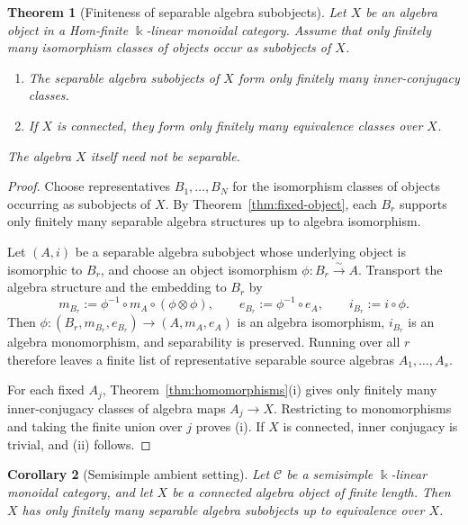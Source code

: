 \documentclass[11pt]{amsart}
\newtheorem{theorem}{Theorem}[section]
\newtheorem{corollary}[theorem]{Corollary}
\theoremstyle{definition}
\theoremstyle{remark}
\newcommand{\C}{\mathcal C}
\newcommand{\kk}{\Bbbk}
\begin{document}
\begin{theorem}[Finiteness of separable algebra subobjects]
\label{thm:subobjects}
Let $X$ be an algebra object in a Hom-finite $\kk$-linear monoidal category.
Assume that only finitely many isomorphism classes of objects occur as
subobjects of $X$.
\begin{enumerate}[label=\textup{(\roman*)}]
  \item The separable algebra subobjects of $X$ form only finitely many
  inner-conjugacy classes.
  \item If $X$ is connected, they form only finitely many equivalence
  classes over $X$.
\end{enumerate}
The algebra $X$ itself need not be separable.
\end{theorem}

\begin{proof}
Choose representatives $B_1,\ldots,B_N$ for the isomorphism classes of
objects occurring as subobjects of $X$.  By
Theorem~\ref{thm:fixed-object}, each $B_r$ supports only finitely many
separable algebra structures up to algebra isomorphism.

Let $(A,i)$ be a separable algebra subobject whose underlying object is
isomorphic to $B_r$, and choose an object isomorphism
$\phi:B_r\xrightarrow{\sim}A$.  Transport the algebra structure and the
embedding to $B_r$ by
\[
 m_{B_r}:=\phi^{-1}\circ m_A\circ(\phi\otimes\phi),\qquad
 e_{B_r}:=\phi^{-1}\circ e_A,\qquad
 i_{B_r}:=i\circ\phi.
\]
Then $\phi:(B_r,m_{B_r},e_{B_r})\to(A,m_A,e_A)$ is an algebra
isomorphism, $i_{B_r}$ is an algebra monomorphism, and separability is
preserved.  Running over all $r$ therefore leaves a finite list of
representative separable source algebras $A_1,\ldots,A_s$.

For each fixed $A_j$, Theorem~\ref{thm:homomorphisms}\textup{(i)} gives
only finitely many inner-conjugacy classes of algebra maps $A_j\to X$.
Restricting to monomorphisms and taking the finite union over $j$ proves
\textup{(i)}.  If $X$ is connected, inner conjugacy is trivial, and
\textup{(ii)} follows.
\end{proof}

\begin{corollary}[Semisimple ambient setting]\label{cor:semisimple}
Let $\C$ be a semisimple $\kk$-linear monoidal category, and
let $X$ be a connected algebra object of finite length.  Then $X$ has only
finitely many separable algebra subobjects up to equivalence over $X$.


\end{corollary}
\end{document}
